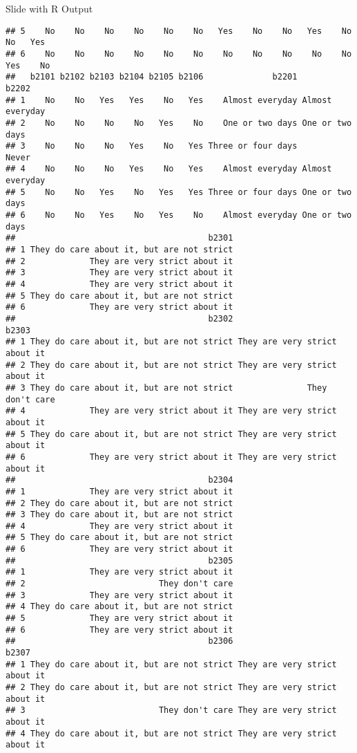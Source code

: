 \documentclass[
  ignorenonframetext,
]{beamer}
\begin{document}
\begin{frame}[fragile]{Slide with R Output}
\begin{verbatim}
## 5    No    No    No    No    No    No   Yes    No    No   Yes    No    No   Yes
## 6    No    No    No    No    No    No    No    No    No    No    No   Yes    No
##   b2101 b2102 b2103 b2104 b2105 b2106              b2201           b2202
## 1    No    No   Yes   Yes    No   Yes    Almost everyday Almost everyday
## 2    No    No    No    No   Yes    No    One or two days One or two days
## 3    No    No    No   Yes    No   Yes Three or four days           Never
## 4    No    No    No   Yes    No   Yes    Almost everyday Almost everyday
## 5    No    No   Yes    No   Yes   Yes Three or four days One or two days
## 6    No    No   Yes    No   Yes    No    Almost everyday One or two days
##                                       b2301
## 1 They do care about it, but are not strict
## 2             They are very strict about it
## 3             They are very strict about it
## 4             They are very strict about it
## 5 They do care about it, but are not strict
## 6             They are very strict about it
##                                       b2302                         b2303
## 1 They do care about it, but are not strict They are very strict about it
## 2 They do care about it, but are not strict They are very strict about it
## 3 They do care about it, but are not strict               They don't care
## 4             They are very strict about it They are very strict about it
## 5 They do care about it, but are not strict They are very strict about it
## 6             They are very strict about it They are very strict about it
##                                       b2304
## 1             They are very strict about it
## 2 They do care about it, but are not strict
## 3 They do care about it, but are not strict
## 4             They are very strict about it
## 5 They do care about it, but are not strict
## 6             They are very strict about it
##                                       b2305
## 1             They are very strict about it
## 2                           They don't care
## 3             They are very strict about it
## 4 They do care about it, but are not strict
## 5             They are very strict about it
## 6             They are very strict about it
##                                       b2306                         b2307
## 1 They do care about it, but are not strict They are very strict about it
## 2 They do care about it, but are not strict They are very strict about it
## 3                           They don't care They are very strict about it
## 4 They do care about it, but are not strict They are very strict about it

\end{verbatim}
\end{frame}
\end{document}

